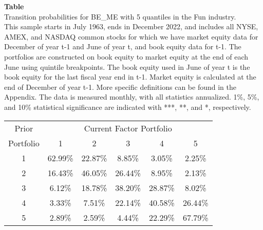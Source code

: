 \begin{table*}[ht!]
\raggedright
{}
\label{tab: transition_probs_BE_ME_Fun_with_5_quantiles}
\textbf{Table \thetable} \\
Transition probabilities for BE_ME with 5 quantiles in the Fun industry. \\
\hspace*{1em}This sample starts in July 1963, ends in December 2022, and includes all NYSE, AMEX, and NASDAQ common stocks for which we have market equity data for December of year t-1 and June of year t, and book equity data for t-1. The portfolios are constructed on book equity to market equity at the end of each June using quintile breakpoints.  The book equity used in June of year t is the book equity for the last fiscal year end in t-1.  Market equity is calculated at the end of December of year t-1.  More specific definitions can be found in the Appendix.  The data is measured monthly, with all statistics annualized.  1\%, 5\%, and 10\% statistical significance are indicated with ***, **, and *, respectively. \\
\vspace{0.5em}
\centering
\begin{adjustbox}{max width=\textwidth}
\begin{tabular}{@{}cccccc@{}}
\toprule
Prior & \multicolumn{5}{c}{Current Factor Portfolio} \\
Portfolio & 1 & 2 & 3 & 4 & 5 \\
\midrule
1 & 62.99\% & 22.87\% & 8.85\% & 3.05\% & 2.25\% \\
2 & 16.43\% & 46.05\% & 26.44\% & 8.95\% & 2.13\% \\
3 & 6.12\% & 18.78\% & 38.20\% & 28.87\% & 8.02\% \\
4 & 3.33\% & 7.51\% & 22.14\% & 40.58\% & 26.44\% \\
5 & 2.89\% & 2.59\% & 4.44\% & 22.29\% & 67.79\% \\
\bottomrule
\end{tabular}
\end{adjustbox}
\end{table*}